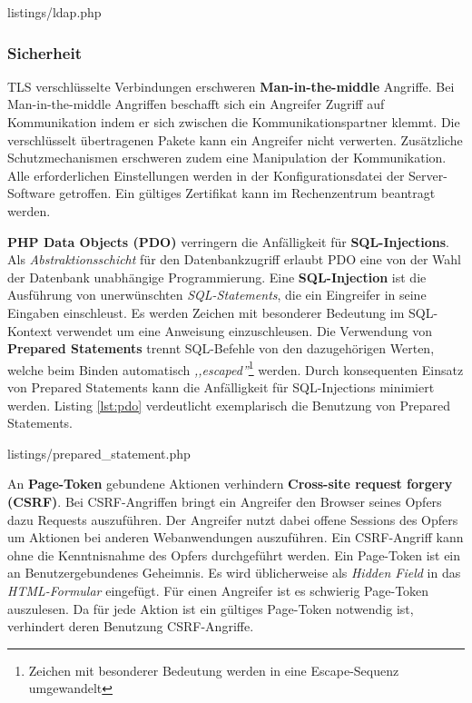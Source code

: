 \documentclass[12pt,a4paper,pointednumbers,abstracton]{scrartcl}
\begin{document}
\begin{minipage}{\textwidth}
	
	{listings/ldap.php}
\end{minipage}


\subsubsection{Sicherheit}

TLS verschlüsselte Verbindungen erschweren \textbf{Man-in-the-middle} Angriffe.
Bei Man-in-the-middle Angriffen beschafft sich ein Angreifer Zugriff auf Kommunikation indem er sich zwischen die Kommunikationspartner klemmt.
Die verschlüsselt übertragenen Pakete kann ein Angreifer nicht verwerten.
Zusätzliche Schutzmechanismen erschweren zudem eine Manipulation der Kommunikation.
Alle erforderlichen Einstellungen werden in der Konfigurationsdatei der Server-Software getroffen.
Ein gültiges Zertifikat kann im Rechenzentrum beantragt werden.

\textbf{PHP Data Objects (PDO)} verringern die Anfälligkeit für \textbf{SQL-Injections}.
Als \emph{Abstraktionsschicht} für den Datenbankzugriff erlaubt PDO eine von der Wahl der Datenbank unabhängige Programmierung.
Eine \textbf{SQL-Injection} ist die Ausführung von unerwünschten \emph{SQL-Statements}, die ein Eingreifer in seine Eingaben einschleust.
Es werden Zeichen mit besonderer Bedeutung im SQL-Kontext verwendet um eine Anweisung einzuschleusen.
Die Verwendung von \textbf{Prepared Statements} trennt SQL-Befehle von den dazugehörigen Werten, welche beim Binden automatisch \emph{,,escaped''}\footnote{Zeichen mit besonderer Bedeutung werden in eine Escape-Sequenz umgewandelt} werden.
Durch konsequenten Einsatz von Prepared Statements kann die Anfälligkeit für SQL-Injections minimiert werden.
Listing \ref{lst:pdo} verdeutlicht exemplarisch die Benutzung von Prepared Statements.

\begin{minipage}{\textwidth}
	
	{listings/prepared_statement.php}
\end{minipage}

An \textbf{Page-Token} gebundene Aktionen verhindern \textbf{Cross-site request forgery (CSRF)}.
Bei CSRF-Angriffen bringt ein Angreifer den Browser seines Opfers dazu Requests auszuführen.
Der Angreifer nutzt dabei offene Sessions des Opfers um Aktionen bei anderen Webanwendungen auszuführen.
Ein CSRF-Angriff kann ohne die Kenntnisnahme des Opfers durchgeführt werden.
Ein Page-Token ist ein an Benutzergebundenes Geheimnis. Es wird üblicherweise als \emph{Hidden Field} in das \emph{HTML-Formular} eingefügt.
Für einen Angreifer ist es schwierig Page-Token auszulesen.
Da für jede Aktion ist ein gültiges Page-Token notwendig ist, verhindert deren Benutzung CSRF-Angriffe.
\end{document}
